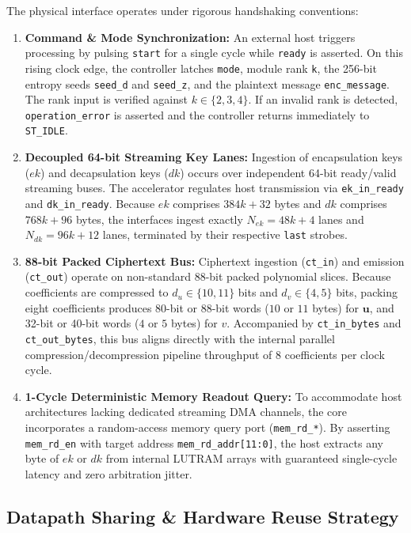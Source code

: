 The physical interface operates under rigorous handshaking conventions:
\begin{enumerate}
    \item \textbf{Command \& Mode Synchronization:} An external host triggers processing by pulsing \texttt{start} for a single cycle while \texttt{ready} is asserted. On this rising clock edge, the controller latches \texttt{mode}, module rank \texttt{k}, the 256-bit entropy seeds \texttt{seed\_d} and \texttt{seed\_z}, and the plaintext message \texttt{enc\_message}. The rank input is verified against $k \in \{2, 3, 4\}$. If an invalid rank is detected, \texttt{operation\_error} is asserted and the controller returns immediately to \texttt{ST\_IDLE}.
    \item \textbf{Decoupled 64-bit Streaming Key Lanes:} Ingestion of encapsulation keys ($ek$) and decapsulation keys ($dk$) occurs over independent 64-bit ready/valid streaming buses. The accelerator regulates host transmission via \texttt{ek\_in\_ready} and \texttt{dk\_in\_ready}. Because $ek$ comprises $384k + 32$ bytes and $dk$ comprises $768k + 96$ bytes, the interfaces ingest exactly $N_{ek} = 48k + 4$ lanes and $N_{dk} = 96k + 12$ lanes, terminated by their respective \texttt{last} strobes.
    \item \textbf{88-bit Packed Ciphertext Bus:} Ciphertext ingestion (\texttt{ct\_in}) and emission (\texttt{ct\_out}) operate on non-standard 88-bit packed polynomial slices. Because coefficients are compressed to $d_u \in \{10, 11\}$ bits and $d_v \in \{4, 5\}$ bits, packing eight coefficients produces 80-bit or 88-bit words ($10$ or $11$ bytes) for $\mathbf{u}$, and 32-bit or 40-bit words ($4$ or $5$ bytes) for $v$. Accompanied by \texttt{ct\_in\_bytes} and \texttt{ct\_out\_bytes}, this bus aligns directly with the internal parallel compression/decompression pipeline throughput of 8 coefficients per clock cycle.
    \item \textbf{1-Cycle Deterministic Memory Readout Query:} To accommodate host architectures lacking dedicated streaming DMA channels, the core incorporates a random-access memory query port (\texttt{mem\_rd\_*}). By asserting \texttt{mem\_rd\_en} with target address \texttt{mem\_rd\_addr[11:0]}, the host extracts any byte of $ek$ or $dk$ from internal LUTRAM arrays with guaranteed single-cycle latency and zero arbitration jitter.
\end{enumerate}

\subsection{Datapath Sharing \& Hardware Reuse Strategy}
\label{sec:arch_reuse}

